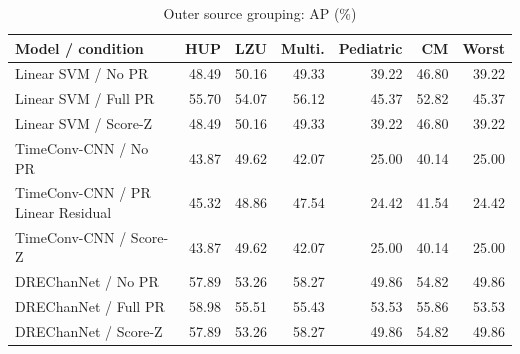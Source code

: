 \begin{table}[t]
\centering
\caption{Outer source grouping: AP (\%)}
\small
\begin{tabular}{lrrrrrr}
\toprule
Model / condition & HUP & LZU & Multi. & Pediatric & CM & Worst \\
\midrule
Linear SVM / No PR & 48.49 & 50.16 & 49.33 & 39.22 & 46.80 & 39.22 \\
Linear SVM / Full PR & 55.70 & 54.07 & 56.12 & 45.37 & 52.82 & 45.37 \\
Linear SVM / Score-Z & 48.49 & 50.16 & 49.33 & 39.22 & 46.80 & 39.22 \\
TimeConv-CNN / No PR & 43.87 & 49.62 & 42.07 & 25.00 & 40.14 & 25.00 \\
TimeConv-CNN / PR Linear Residual & 45.32 & 48.86 & 47.54 & 24.42 & 41.54 & 24.42 \\
TimeConv-CNN / Score-Z & 43.87 & 49.62 & 42.07 & 25.00 & 40.14 & 25.00 \\
DREChanNet / No PR & 57.89 & 53.26 & 58.27 & 49.86 & 54.82 & 49.86 \\
DREChanNet / Full PR & 58.98 & 55.51 & 55.43 & 53.53 & 55.86 & 53.53 \\
DREChanNet / Score-Z & 57.89 & 53.26 & 58.27 & 49.86 & 54.82 & 49.86 \\
\bottomrule
\end{tabular}
\end{table}
